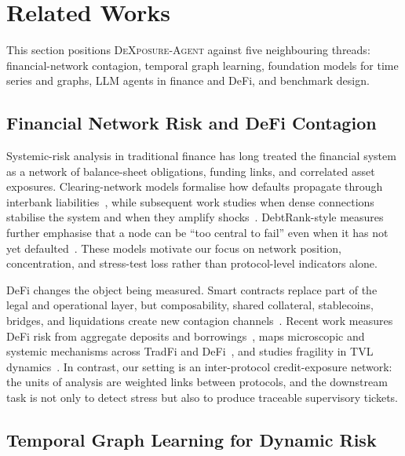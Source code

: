 \section{Related Works}

This section positions \textsc{DeXposure-Agent} against five neighbouring
threads: financial-network contagion, temporal graph learning, foundation
models for time series and graphs, LLM agents in finance and DeFi, and
benchmark design.

\subsection{Financial Network Risk and DeFi Contagion}

Systemic-risk analysis in traditional finance has long treated the financial
system as a network of balance-sheet obligations, funding links, and correlated
asset exposures. Clearing-network models formalise how defaults propagate
through interbank liabilities~\cite{EisenbergNoe2001}, while subsequent work
studies when dense connections stabilise the system and when they amplify
shocks~\cite{Acemoglu2015SystemicRisk,GlassermanYoung2016Contagion}.
DebtRank-style measures further emphasise that a node can be ``too central to
fail'' even when it has not yet defaulted~\cite{BattistonEtAl2012DebtRank}.
These models motivate our focus on network position, concentration, and
stress-test loss rather than protocol-level indicators alone.

DeFi changes the object being measured. Smart contracts replace part of the
legal and operational layer, but composability, shared collateral, stablecoins,
bridges, and liquidations create new contagion channels~\cite{Schar2021DeFi,
gogol2024sokdecentralizedfinancedefi,ESRB2025}. Recent work measures DeFi
risk from aggregate deposits and borrowings~\cite{BERTOMEU2024105321}, maps
microscopic and systemic mechanisms across TradFi and
DeFi~\cite{aufiero2025mappingmicroscopicsystemicrisks}, and studies fragility
in TVL dynamics~\cite{ZhangEtAl2026TVLDynamics}. In contrast, our setting is
an inter-protocol credit-exposure network: the units of analysis are weighted
links between protocols, and the downstream task is not only to detect stress
but also to produce traceable supervisory tickets.

\subsection{Temporal Graph Learning for Dynamic Risk}

